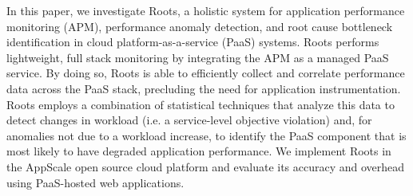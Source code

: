 In this paper, we investigate Roots, a holistic 
system for application performance monitoring (APM), 
performance anomaly detection, and root cause bottleneck identification 
in cloud platform-as-a-service (PaaS) systems.
Roots performs lightweight, full stack monitoring by integrating
the APM as a managed PaaS service.  By doing so, Roots is able to 
efficiently collect and correlate performance data across the PaaS stack,
precluding the need for application instrumentation.  Roots employs
a combination of statistical techniques that analyze this data to detect
changes in workload (i.e. a service-level objective violation) and, for 
anomalies not due to a workload increase, to identify the PaaS component
that is most likely to have degraded application performance. 
We implement Roots in the AppScale open source cloud platform and evaluate its 
accuracy and overhead using PaaS-hosted web applications.

